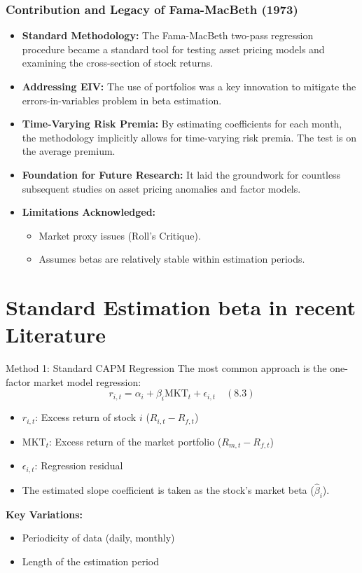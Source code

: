 \documentclass[10pt]{beamer}
\begin{document}
\begin{frame}
  \frametitle{Contribution and Legacy of Fama-MacBeth (1973)}
  \begin{itemize}
    \item \textbf{Standard Methodology:} The Fama-MacBeth two-pass regression procedure became a standard tool for testing asset pricing models and examining the cross-section of stock returns.
    \item \textbf{Addressing EIV:} The use of portfolios was a key innovation to mitigate the errors-in-variables problem in beta estimation.
    \item \textbf{Time-Varying Risk Premia:} By estimating coefficients for each month, the methodology implicitly allows for time-varying risk premia. The test is on the average premium.
    \item \textbf{Foundation for Future Research:} It laid the groundwork for countless subsequent studies on asset pricing anomalies and factor models.
    \item \textbf{Limitations Acknowledged:}
        \begin{itemize}
            \item Market proxy issues (Roll's Critique).
            \item Assumes betas are relatively stable within estimation periods.
        \end{itemize}
  \end{itemize}
\end{frame}

\section{Standard Estimation beta in recent Literature}

\begin{frame}{Method 1: Standard CAPM Regression}
  The most common approach is the one-factor market model regression:
  \begin{equation*}
    r_{i,t} = \alpha_i + \beta_i \text{MKT}_t + \epsilon_{i,t} \quad (8.3)
  \end{equation*}
  \begin{itemize}
    \item $r_{i,t}$: Excess return of stock $i$ ($R_{i,t} - R_{f,t}$)
    \item $\text{MKT}_t$: Excess return of the market portfolio ($R_{m,t} - R_{f,t}$)
    \item $\epsilon_{i,t}$: Regression residual
    \item The estimated slope coefficient is taken as the stock's market beta ($\hat{\beta}_i$).
  \end{itemize}

  \textbf{Key Variations:}
  \begin{itemize}
    \item Periodicity of data (daily, monthly)
    \item Length of the estimation period
  \end{itemize}
\end{frame}
\end{document}
